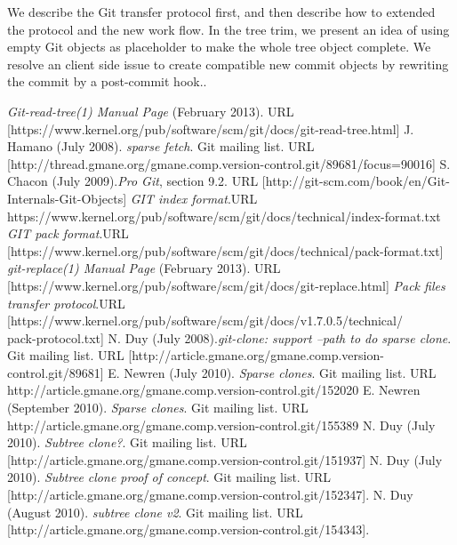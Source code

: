 \documentclass[preprint]{sigplanconf}
\begin{document}
We describe the Git transfer protocol first, and then describe how to extended the protocol and the new work flow.
In the tree trim, we present an idea of using empty Git objects as placeholder to make the whole tree object complete.
We resolve an client side issue to create compatible new commit objects by rewriting the commit by a post-commit hook..

\begin{thebibliography}{10}
    \softraggedright

     \emph{Git-read-tree(1) Manual Page} (February
      2013). \newblock URL
      [https://www.kernel.org/pub/software/scm/git/docs/git-read-tree.html]
     J. Hamano (July 2008). \newblock \emph{sparse fetch}.
    \newblock Git mailing list. \newblock URL
      [http://thread.gmane.org/gmane.comp.version-control.git/89681/focus=90016]
     S. Chacon (July 2009).\newblock\emph{Pro Git}, section 9.2.
      \newblock URL
      [http://git-scm.com/book/en/Git-Internals-Git-Objects]
       \emph{GIT index format}.\newblock URL
      https://www.kernel.org/pub/software/scm/git/docs/technical/index-format.txt
     \emph{GIT pack format}.\newblock URL
      [https://www.kernel.org/pub/software/scm/git/docs/technical/pack-format.txt]
     \emph{git-replace(1) Manual Page} (February 2013).\newblock
      URL [https://www.kernel.org/pub/software/scm/git/docs/git-replace.html]
     \emph{Pack files transfer protocol}.\newblock URL
      [https://www.kernel.org/pub/software/scm/git/docs/v1.7.0.5/technical/\\
      pack-protocol.txt]
    N. Duy (July 2008).\newblock \emph{git-clone: support --path
      to do sparse clone}. \newblock Git mailing list. \newblock URL
      [http://article.gmane.org/gmane.comp.version-control.git/89681]
    E. Newren (July 2010). \newblock \emph{Sparse clones}.
      \newblock Git mailing list. \newblock URL
      http://article.gmane.org/gmane.comp.version-control.git/152020
    E. Newren (September 2010). \newblock \emph{Sparse
      clones}.  \newblock Git mailing list. \newblock URL
      http://article.gmane.org/gmane.comp.version-control.git/155389
    N. Duy (July 2010). \newblock \emph{Subtree clone?}. \newblock
      Git mailing list. \newblock URL
      [http://article.gmane.org/gmane.comp.version-control.git/151937]
    N. Duy (July 2010). \newblock \emph{Subtree clone proof of
    concept}. \newblock Git mailing list. \newblock URL
    [http://article.gmane.org/gmane.comp.version-control.git/152347].
    N. Duy (August 2010). \newblock \emph{subtree clone v2}.
    \newblock Git mailing list. \newblock
    URL [http://article.gmane.org/gmane.comp.version-control.git/154343].
\end{thebibliography}
\end{document}
